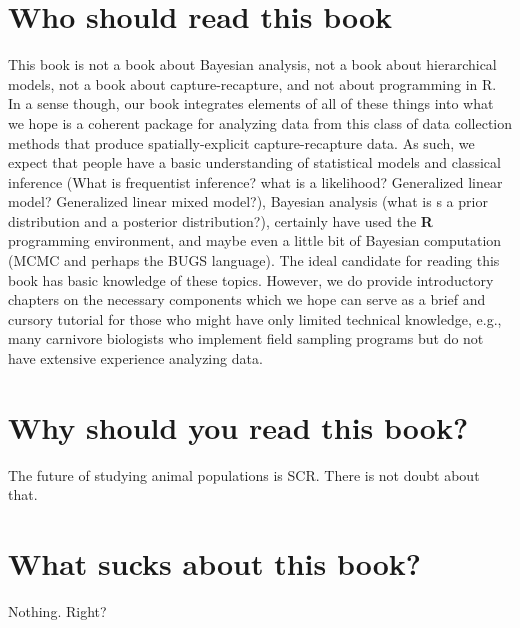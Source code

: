 \section*{Who should read this book}

This book is not a book about Bayesian analysis, not a book about
hierarchical models, not a book about capture-recapture, and not about
programming in R. In a sense though, our book integrates elements of
all of these things into what we hope is a coherent package for
analyzing data from this class of data collection methods
that produce spatially-explicit capture-recapture data.   As such, we
expect that people have a basic understanding of statistical models
and classical inference (What is frequentist inference? what is a
likelihood? Generalized linear model? Generalized linear mixed
model?), 
 Bayesian analysis (what is s a prior distribution and a
posterior distribution?),
certainly have used the {\bf R} programming environment,
and maybe even a little bit
of Bayesian
computation (MCMC and perhaps the BUGS language).
The ideal candidate for reading this book has basic knowledge of these
topics. However, we do provide introductory chapters on the necessary
components which we hope can serve as a brief and cursory tutorial for
those who might have only limited technical knowledge, e.g., many
carnivore biologists who implement field sampling programs but do not
have extensive experience analyzing data.

\section*{Why should you read this book?}

The future of studying animal populations is SCR. There is not doubt
about that. 

\section{What sucks about this book?}

Nothing. Right?



